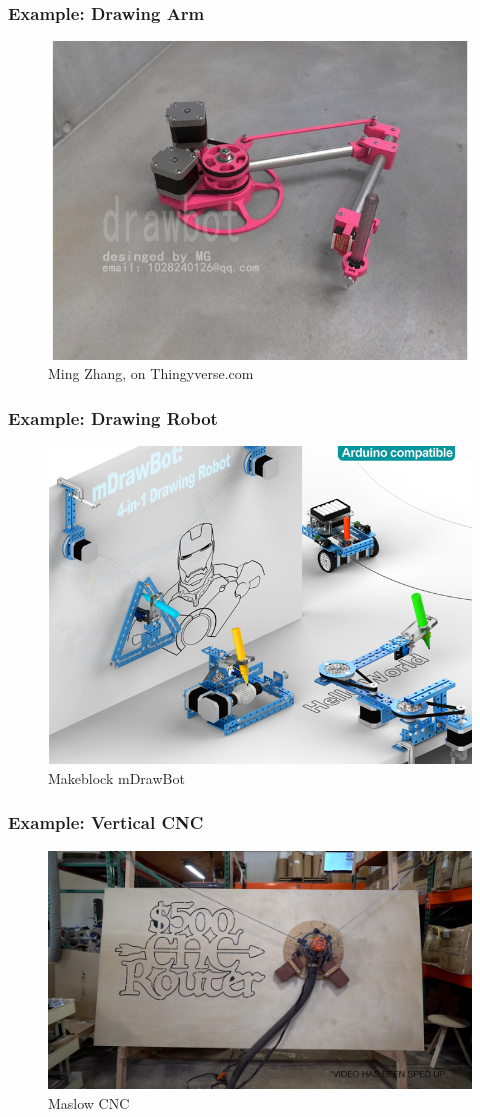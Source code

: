 \documentclass[12pt]{beamer}
\begin{document}
\begin{frame}[c]\frametitle{Example: Drawing Arm}
\begin{figure}
  \centering
  \includegraphics[width=.7\textwidth]{images/drawingrobot2.jpg}
  \caption{Ming Zhang, on Thingyverse.com}
\end{figure}
\end{frame}

\begin{frame}[c]\frametitle{Example: Drawing Robot}
\begin{figure}
  \centering
  \includegraphics[width=.7\textwidth]{images/drawingrobot3.jpg}
  \caption{Makeblock mDrawBot}
\end{figure}
\end{frame}

\begin{frame}[c]\frametitle{Example: Vertical CNC}
\begin{figure}
  \centering
  \includegraphics[width=.8\textwidth]{images/maslowCNC.jpg}
  \caption{Maslow CNC}
\end{figure}
\end{frame}
\end{document}
